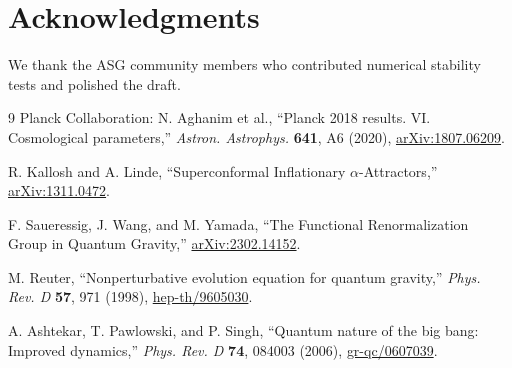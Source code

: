 \documentclass[11pt,a4paper]{article}
\begin{document}
\section*{Acknowledgments}
We thank the ASG community members who contributed numerical stability tests and polished the draft.

\begin{thebibliography}{9}
Planck Collaboration: N. Aghanim et al., ``Planck 2018 results. VI. Cosmological parameters,'' \textit{Astron. Astrophys.} \textbf{641}, A6 (2020), \href{https://arxiv.org/abs/1807.06209}{arXiv:1807.06209}.

R. Kallosh and A. Linde, ``Superconformal Inflationary $\alpha$-Attractors,'' \href{https://arxiv.org/abs/1311.0472}{arXiv:1311.0472}.

F. Saueressig, J. Wang, and M. Yamada, ``The Functional Renormalization Group in Quantum Gravity,'' \href{https://arxiv.org/abs/2302.14152}{arXiv:2302.14152}.

M. Reuter, ``Nonperturbative evolution equation for quantum gravity,'' \textit{Phys. Rev. D} \textbf{57}, 971 (1998), \href{https://arxiv.org/abs/hep-th/9605030}{hep-th/9605030}.

A. Ashtekar, T. Pawlowski, and P. Singh, ``Quantum nature of the big bang: Improved dynamics,'' \textit{Phys. Rev. D} \textbf{74}, 084003 (2006), \href{https://arxiv.org/abs/gr-qc/0607039}{gr-qc/0607039}.
\end{thebibliography}
\end{document}
